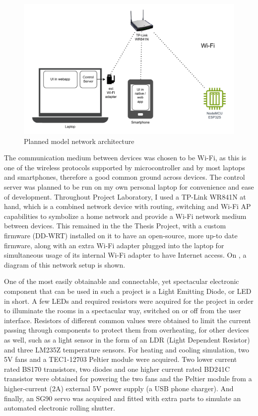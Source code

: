 \begin{figure}[!ht]
    \centering
    \includegraphics[page=1,keepaspectratio,width=150mm]{figures/box_network.drawio.pdf}
    \caption{Planned model network architecture}
    \label{fig:BoxNetwork}
\end{figure}

The communication medium between devices was chosen to be Wi-Fi, as this is one of the wireless protocols supported by microcontroller and by most laptops and smartphones, therefore a good common ground across devices. The control server was planned to be run on my own personal laptop for convenience and ease of development. Throughout Project Laboratory, I used a TP-Link WR841N at hand, which is a combined network device with routing, switching and Wi-Fi AP capabilities to symbolize a home network and provide a Wi-Fi network medium between devices. This remained in the the Thesis Project, with a custom firmware (DD-WRT) installed on it to have an open-source, more up-to date firmware, along with an extra Wi-Fi adapter plugged into the laptop for simultaneous usage of its internal Wi-Fi adapter to have Internet access. On , a diagram of this network setup is shown.

One of the most easily obtainable and connectable, yet spectacular electronic component that can be used in such a project is a Light Emitting Diode, or LED in short. A few LEDs and required resistors were acquired for the project in order to illuminate the rooms in a spectacular way, switched on or off from the user interface. Resistors of different common values were obtained to limit the current passing through components to protect them from overheating, for other devices as well, such as a light sensor in the form of an LDR (Light Dependent Resistor) and three LM235Z temperature sensors. For heating and cooling simulation, two 5V fans and a TEC1-12703 Peltier module were acquired. Two lower current rated BS170 transistors, two diodes and one higher current rated BD241C transistor were obtained for powering the two fans and the Peltier module from a higher-current (2A) external 5V power supply (a USB phone charger). And finally, an SG90 servo was acquired and fitted with extra parts to simulate an automated electronic rolling shutter.

